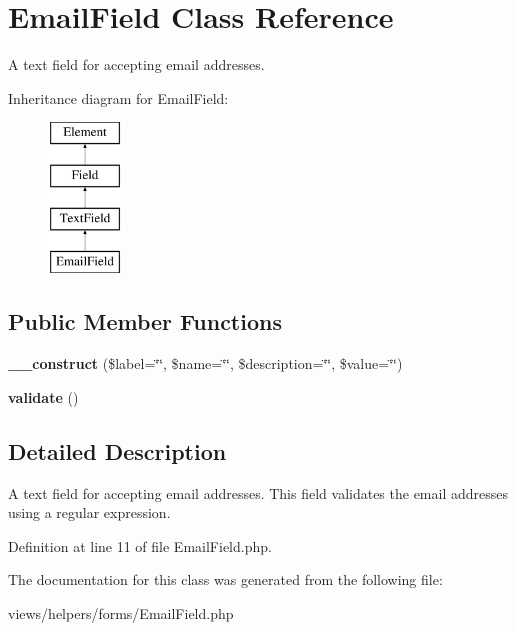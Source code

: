 \hypertarget{class_email_field}{
\section{EmailField Class Reference}
\label{class_email_field}
}


A text field for accepting email addresses.  


Inheritance diagram for EmailField:\begin{figure}[H]
\begin{center}
\leavevmode
\includegraphics[height=4.000000cm]{class_email_field}
\end{center}
\end{figure}
\subsection*{Public Member Functions}
\begin{DoxyCompactItemize}
\item 
\hypertarget{class_email_field_a3f070bef23dc78b62e2cd9a6e8b00310}{
{\bfseries \_\-\_\-construct} (\$label=\char`\"{}\char`\"{}, \$name=\char`\"{}\char`\"{}, \$description=\char`\"{}\char`\"{}, \$value=\char`\"{}\char`\"{})}
\label{class_email_field_a3f070bef23dc78b62e2cd9a6e8b00310}

\item 
\hypertarget{class_email_field_a9a870304b2043359f52f4ea0cae56db4}{
{\bfseries validate} ()}
\label{class_email_field_a9a870304b2043359f52f4ea0cae56db4}

\end{DoxyCompactItemize}


\subsection{Detailed Description}
A text field for accepting email addresses. This field validates the email addresses using a regular expression. 

Definition at line 11 of file EmailField.php.



The documentation for this class was generated from the following file:\begin{DoxyCompactItemize}
\item 
views/helpers/forms/EmailField.php\end{DoxyCompactItemize}
